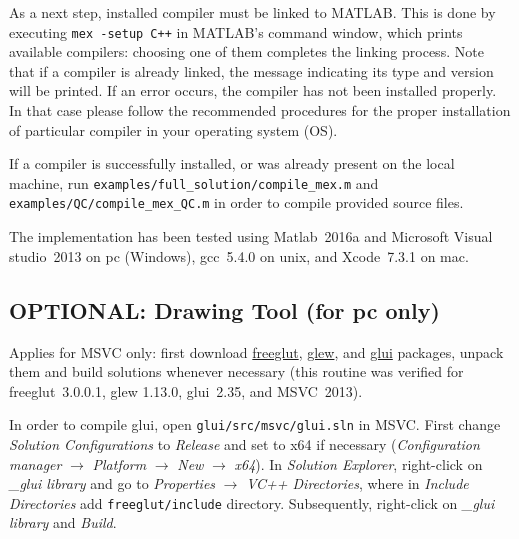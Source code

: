\documentclass[preprint,12pt,authoryear]{elsarticle}
\begin{document}
As a next step, installed compiler must be linked to MATLAB. This is done by executing \texttt{mex -setup C++} in MATLAB's command window, which prints available compilers: choosing one of them completes the linking process. Note that if a compiler is already linked, the message indicating its type and version will be printed. If an error occurs, the compiler has not been installed properly. In that case please follow the recommended procedures for the proper installation of particular compiler in your operating system (OS).

If a compiler is successfully installed, or was already present on the local machine, run \texttt{examples/\allowbreak full\_solution/\allowbreak compile\_mex.m} and \texttt{examples/\allowbreak QC/\allowbreak compile\_mex\_QC.m} in order to compile provided source files.

The implementation has been tested using Matlab~2016a and Microsoft Visual studio~2013 on pc (Windows), gcc~5.4.0 on unix, and Xcode~7.3.1 on mac.
%
%
\subsection{OPTIONAL: Drawing Tool (for pc only)}
\label{SubSect:3.2}
%
Applies for MSVC only: first download \href{http://freeglut.sourceforge.net/}{freeglut}, \href{http://glew.sourceforge.net/}{glew}, and \href{http://glui.sourceforge.net/}{glui} packages, unpack them and build solutions whenever necessary (this routine was verified for freeglut~3.0.0.1, glew 1.13.0, glui~2.35, and MSVC~2013).

In order to compile glui, open \texttt{glui/src/msvc/glui.sln} in MSVC. First change \emph{Solution Configurations} to \emph{Release} and set to x64 if necessary (\emph{Configuration manager} $\rightarrow$ \emph{Platform} $\rightarrow$ \emph{New} $\rightarrow$ \emph{x64}). In \emph{Solution Explorer}, right-click on \emph{\_glui library} and go to \emph{Properties} $\rightarrow$ \emph{VC++ Directories}, where in \emph{Include Directories} add \texttt{freeglut/include} directory. Subsequently, right-click on \emph{\_glui library} and \emph{Build}. 
\end{document}
